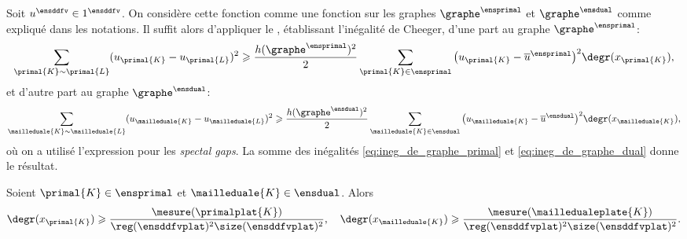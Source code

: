 \begin{demo}
Soit $u^\ensddfv \in \R^\ensddfv$. On considère cette fonction comme une fonction sur les graphes $\graphe^\ensprimal$ et $\graphe^\ensdual$ comme expliqué dans les notations. Il suffit alors d'appliquer le , établissant l'inégalité de Cheeger, d'une part au graphe $\graphe^\ensprimal$: 
\begin{equation} \label{eq:ineg_de_graphe_primal}
\sum_{\primal{K} \sim \primal{L}} ( u_{\primal{K}} - u_{\primal{L}} )^2
\geqslant 
\frac{h(\graphe^\ensprimal)^2}{2}
\sum_{\primal{K} \in \ensprimal} \big( u_{\primal{K}} - \overline{u}^\ensprimal \big)^2 \degr(x_{\primal{K}}),
\end{equation}
et d'autre part au graphe $\graphe^\ensdual$:
\begin{equation} \label{eq:ineg_de_graphe_dual}
\sum_{\mailleduale{K} \sim \mailleduale{L}} ( u_{\mailleduale{K}} - u_{\mailleduale{L}} )^2
\geqslant 
\frac{h(\graphe^\ensdual)^2}{2}
\sum_{\mailleduale{K} \in \ensdual} \big( u_{\mailleduale{K}} - \overline{u}^\ensdual \big)^2 \degr(x_{\mailleduale{K}}),
\end{equation}
où on a utilisé l'expression  pour les \emph{spectal gaps}. La somme des inégalités \ref{eq:ineg_de_graphe_primal} et \ref{eq:ineg_de_graphe_dual} donne le résultat. 
\end{demo}

\begin{lemme} \label{lemme:minoration_degre}
Soient $\primal{K} \in \ensprimal$ et $\mailleduale{K} \in \ensdual$. Alors
\[
\degr(x_{\primal{K}}) \geqslant \frac{\mesure(\primalplat{K})}{\reg(\ensddfvplat)^2 \size(\ensddfvplat)^2},
\quad
\degr(x_{\mailleduale{K}}) \geqslant \frac{\mesure(\mailledualeplate{K})}{\reg(\ensddfvplat)^2 \size(\ensddfvplat)^2}.
\]
\end{lemme}

